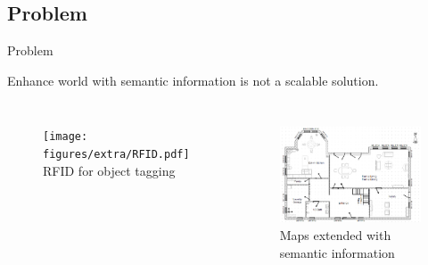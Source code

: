 \documentclass[compress]{beamer}
\begin{document}
\subsection{Problem}
\begin{frame}{Problem}

  Enhance world with semantic information is \alert{not a scalable solution}.

  \begin{block}{}
  \begin{columns}
    \begin{figure}
      \texttt{[image: figures/extra/RFID.pdf]} \\
      RFID for object tagging
    \end{figure}
    \begin{figure}
      \includegraphics[width=\textwidth]{figures/extra/floorplan.jpg} \\
      Maps extended with semantic information
    \end{figure}
  \end{columns}
  \end{block}

\end{frame}
\end{document}
